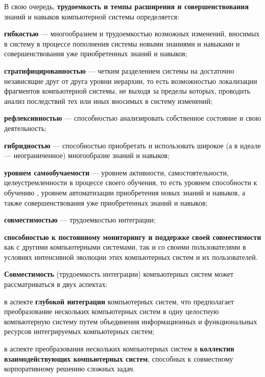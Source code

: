В свою очередь, \textbf{трудоемкость и темпы расширения и совершенствования} знаний и навыков компьютерной системы определяется:
\begin{textitemize}
    \item \textbf{гибкостью} --- многообразием и трудоемкостью возможных изменений, вносимых в систему в процессе пополнения системы новыми знаниями и навыками и совершенствования уже приобретенных знаний и навыков;
    \item \textbf{стратифицированностью} --- четким разделением системы на достаточно независящие друг от друга уровни иерархии, то есть возможностью локализации фрагментов компьютерной системы, не выходя за пределы которых,  проводить анализ последствий тех или иных вносимых в систему изменений;
    \item \textbf{рефлексивностью} --- способностью анализировать собственное состояние и свою деятельность;
    \item \textbf{гибридностью} --- способностью приобретать и использовать широкое (а в идеале --- неограниченное) многообразие знаний и навыков;
    \item \textbf{уровнем самообучаемости} --- уровнем активности, самостоятельности, целеустремленности в процессе своего обучения, то есть уровнем способности к обучению , уровнем автоматизации приобретения новых знаний и навыков, а также совершенствования уже приобретенных знаний и навыков;
    \item \textbf{совместимостью} --- трудоемкостью интеграции;
    \item \textbf{способностью к постоянному мониторингу и поддержке своей совместимости} как с другими компьютерными системами, так и со своими пользователями в условиях интенсивной эволюции этих компьютерных систем и их пользователей. 
\end{textitemize}

\textbf{Совместимость} (трудоемкость интеграции) компьютерных систем может рассматриваться в двух аспектах:
\begin{textitemize}
    \item в аспекте \textbf{глубокой интеграции} компьютерных систем, что предполагает преобразование нескольких компьютерных систем в одну целостную компьютерную систему путем объединения информационных и функциональных ресурсов интегрируемых компьютерных систем;
    \item в аспекте преобразования нескольких компьютерных систем в \textbf{коллектив взаимодействующих компьютерных систем}, способных к совместному корпоративному решению сложных задач.
\end{textitemize}

